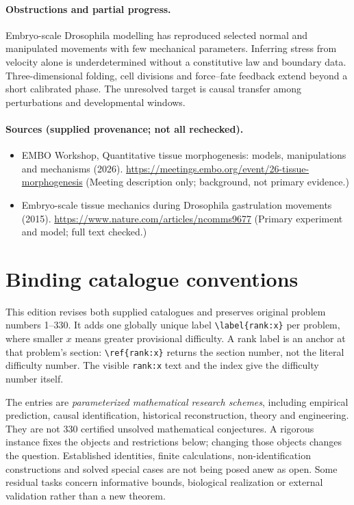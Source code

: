 \documentclass[11pt]{article}
\begin{document}
\paragraph{Obstructions and partial progress.} Embryo-scale Drosophila modelling has reproduced selected normal and manipulated movements with few mechanical parameters. Inferring stress from velocity alone is underdetermined without a constitutive law and boundary data. Three-dimensional folding, cell divisions and force--fate feedback extend beyond a short calibrated phase. The unresolved target is causal transfer among perturbations and developmental windows.
\paragraph{Sources (supplied provenance; not all rechecked).} \begin{itemize}
\item EMBO Workshop, Quantitative tissue morphogenesis: models, manipulations and mechanisms (2026). \url{https://meetings.embo.org/event/26-tissue-morphogenesis} (Meeting description only; background, not primary evidence.)
\item Embryo-scale tissue mechanics during Drosophila gastrulation movements (2015). \url{https://www.nature.com/articles/ncomms9677} (Primary experiment and model; full text checked.)
\end{itemize}


\section*{Binding catalogue conventions}
This edition revises both supplied catalogues and preserves original problem numbers 1--330. It adds one globally unique label \verb|\label{rank:x}| per problem, where smaller $x$ means greater provisional difficulty. A rank label is an anchor at that problem's section: \verb|\ref{rank:x}| returns the section number, not the literal difficulty number. The visible \texttt{rank:x} text and the index give the difficulty number itself.

The entries are \emph{parameterized mathematical research schemes}, including empirical prediction, causal identification, historical reconstruction, theory and engineering. They are not 330 certified unsolved mathematical conjectures. A rigorous instance fixes the objects and restrictions below; changing those objects changes the question. Established identities, finite calculations, non-identification constructions and solved special cases are not being posed anew as open. Some residual tasks concern informative bounds, biological realization or external validation rather than a new theorem.
\end{document}
